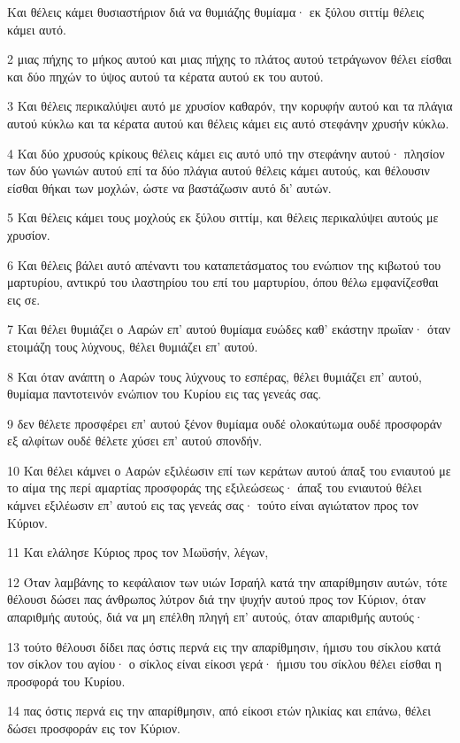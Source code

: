 \par Και θέλεις κάμει θυσιαστήριον διά να θυμιάζης θυμίαμα· εκ ξύλου σιττίμ θέλεις κάμει αυτό.
\par 2 μιας πήχης το μήκος αυτού και μιας πήχης το πλάτος αυτού τετράγωνον θέλει είσθαι και δύο πηχών το ύψος αυτού τα κέρατα αυτού εκ του αυτού.
\par 3 Και θέλεις περικαλύψει αυτό με χρυσίον καθαρόν, την κορυφήν αυτού και τα πλάγια αυτού κύκλω και τα κέρατα αυτού και θέλεις κάμει εις αυτό στεφάνην χρυσήν κύκλω.
\par 4 Και δύο χρυσούς κρίκους θέλεις κάμει εις αυτό υπό την στεφάνην αυτού· πλησίον των δύο γωνιών αυτού επί τα δύο πλάγια αυτού θέλεις κάμει αυτούς, και θέλουσιν είσθαι θήκαι των μοχλών, ώστε να βαστάζωσιν αυτό δι' αυτών.
\par 5 Και θέλεις κάμει τους μοχλούς εκ ξύλου σιττίμ, και θέλεις περικαλύψει αυτούς με χρυσίον.
\par 6 Και θέλεις βάλει αυτό απέναντι του καταπετάσματος του ενώπιον της κιβωτού του μαρτυρίου, αντικρύ του ιλαστηρίου του επί του μαρτυρίου, όπου θέλω εμφανίζεσθαι εις σε.
\par 7 Και θέλει θυμιάζει ο Ααρών επ' αυτού θυμίαμα ευώδες καθ' εκάστην πρωΐαν· όταν ετοιμάζη τους λύχνους, θέλει θυμιάζει επ' αυτού.
\par 8 Και όταν ανάπτη ο Ααρών τους λύχνους το εσπέρας, θέλει θυμιάζει επ' αυτού, θυμίαμα παντοτεινόν ενώπιον του Κυρίου εις τας γενεάς σας.
\par 9 δεν θέλετε προσφέρει επ' αυτού ξένον θυμίαμα ουδέ ολοκαύτωμα ουδέ προσφοράν εξ αλφίτων ουδέ θέλετε χύσει επ' αυτού σπονδήν.
\par 10 Και θέλει κάμνει ο Ααρών εξιλέωσιν επί των κεράτων αυτού άπαξ του ενιαυτού με το αίμα της περί αμαρτίας προσφοράς της εξιλεώσεως· άπαξ του ενιαυτού θέλει κάμνει εξιλέωσιν επ' αυτού εις τας γενεάς σας· τούτο είναι αγιώτατον προς τον Κύριον.
\par 11 Και ελάλησε Κύριος προς τον Μωϋσήν, λέγων,
\par 12 Όταν λαμβάνης το κεφάλαιον των υιών Ισραήλ κατά την απαρίθμησιν αυτών, τότε θέλουσι δώσει πας άνθρωπος λύτρον διά την ψυχήν αυτού προς τον Κύριον, όταν απαριθμής αυτούς, διά να μη επέλθη πληγή επ' αυτούς, όταν απαριθμής αυτούς·
\par 13 τούτο θέλουσι δίδει πας όστις περνά εις την απαρίθμησιν, ήμισυ του σίκλου κατά τον σίκλον του αγίου· ο σίκλος είναι είκοσι γερά· ήμισυ του σίκλου θέλει είσθαι η προσφορά του Κυρίου.
\par 14 πας όστις περνά εις την απαρίθμησιν, από είκοσι ετών ηλικίας και επάνω, θέλει δώσει προσφοράν εις τον Κύριον.
